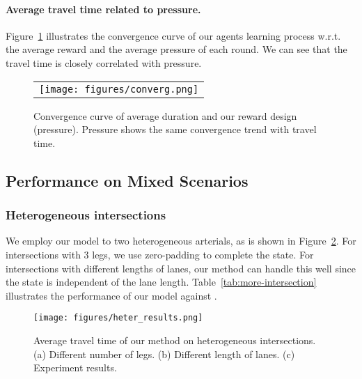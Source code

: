 \paragraph{Average travel time related to pressure.}
Figure~\ref{fig:convergence} illustrates the convergence curve of our agents learning process w.r.t. the average reward and the average pressure of each round. We can see that the travel time is closely correlated with pressure.

\begin{figure}[t]
\begin{center}
  \begin{tabular}{c}
   \texttt{[image: figures/converg.png]} \\
   \end{tabular}
   \end{center}
     \caption{Convergence curve of average duration and our reward design (pressure). Pressure shows the same convergence trend with travel time.}
    \label{fig:convergence}
\end{figure}

\subsection{Performance on Mixed Scenarios}

\subsubsection{Heterogeneous intersections}
We employ our model to two heterogeneous arterials, as is shown in Figure~\ref{fig:heter_inter}. For intersections with 3 legs, we use zero-padding to complete the state. For intersections with different lengths of lanes, our method can handle this well since the state is independent of the lane length. Table~\ref{tab:more-intersection} illustrates the performance of our model against \Maxpressure. 


\begin{figure}[t!]
\centering
   \texttt{[image: figures/heter\_results.png]} 
     \caption{Average travel time of our method on heterogeneous intersections. (a) Different number of legs. (b)  Different length of lanes. (c) Experiment results.}
    \label{fig:heter_inter}
\end{figure}

